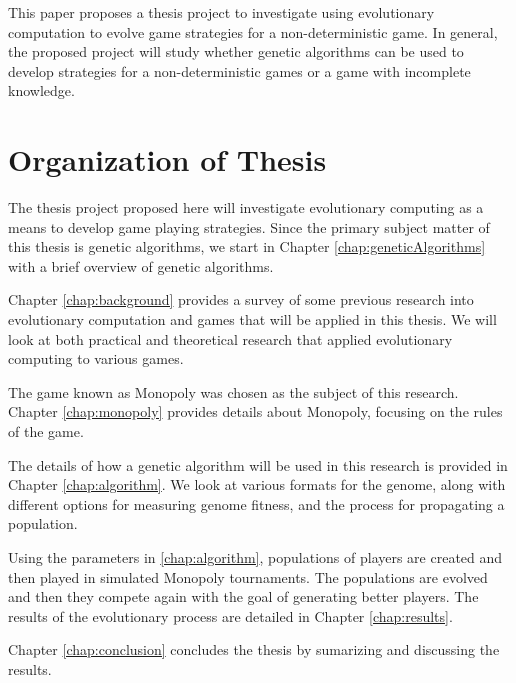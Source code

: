 This paper proposes a thesis project to investigate using evolutionary
computation to evolve game strategies for a non-deterministic game. In general,
the proposed project will study whether genetic algorithms can be used to
develop strategies for a non-deterministic games or a game with incomplete
knowledge.

\section{Organization of Thesis}

The thesis project proposed here will investigate evolutionary computing as a
means to develop game playing strategies. Since the primary subject
matter of this thesis is genetic algorithms, we start in Chapter
\ref{chap:geneticAlgorithms} with a brief overview of genetic algorithms. 

Chapter \ref{chap:background} provides a survey of some previous research into
evolutionary computation and games that will be applied in this thesis. We will
look at both practical and theoretical research that applied evolutionary
computing to various games.

The game known as Monopoly was chosen as the subject of this research. Chapter
\ref{chap:monopoly} provides details about Monopoly, focusing on the rules of
the game.

The details of how a genetic algorithm will be used in this research is provided
in Chapter \ref{chap:algorithm}. We look at various formats for the genome,
along with different options for measuring genome fitness, and the process for
propagating a population.

Using the parameters in \ref{chap:algorithm}, populations of players are created
and then played in simulated Monopoly tournaments. The populations are evolved
and then they compete again with the goal of generating better players. The
results of the evolutionary process are detailed in Chapter \ref{chap:results}.

Chapter \ref{chap:conclusion} concludes the thesis by sumarizing and discussing
the results.
